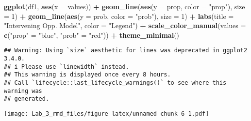 \documentclass[
]{article}
\newenvironment{Shaded}{\begin{snugshade}}{\end{snugshade}}
\newcommand{\AttributeTok}[1]{\textcolor[rgb]{0.13,0.29,0.53}{#1}}
\newcommand{\DecValTok}[1]{\textcolor[rgb]{0.00,0.00,0.81}{#1}}
\newcommand{\FunctionTok}[1]{\textcolor[rgb]{0.13,0.29,0.53}{\textbf{#1}}}
\newcommand{\NormalTok}[1]{#1}
\newcommand{\OtherTok}[1]{\textcolor[rgb]{0.56,0.35,0.01}{#1}}
\newcommand{\SpecialCharTok}[1]{\textcolor[rgb]{0.81,0.36,0.00}{\textbf{#1}}}
\newcommand{\StringTok}[1]{\textcolor[rgb]{0.31,0.60,0.02}{#1}}
\begin{document}
\begin{Shaded}
\begin{Highlighting}[]
\FunctionTok{ggplot}\NormalTok{(df1, }\FunctionTok{aes}\NormalTok{(}\AttributeTok{x =}\NormalTok{ values)) }\SpecialCharTok{+}
  \FunctionTok{geom\_line}\NormalTok{(}\FunctionTok{aes}\NormalTok{(}\AttributeTok{y =}\NormalTok{ prop, }\AttributeTok{color =} \StringTok{"prop"}\NormalTok{), }\AttributeTok{size =} \DecValTok{1}\NormalTok{) }\SpecialCharTok{+}
  \FunctionTok{geom\_line}\NormalTok{(}\FunctionTok{aes}\NormalTok{(}\AttributeTok{y =}\NormalTok{ prob, }\AttributeTok{color =} \StringTok{"prob"}\NormalTok{), }\AttributeTok{size =} \DecValTok{1}\NormalTok{) }\SpecialCharTok{+}
  \FunctionTok{labs}\NormalTok{(}\AttributeTok{title =} \StringTok{"Intervening Opp. Model"}\NormalTok{,}
       \AttributeTok{color =} \StringTok{"Legend"}\NormalTok{) }\SpecialCharTok{+}
  \FunctionTok{scale\_color\_manual}\NormalTok{(}\AttributeTok{values =} \FunctionTok{c}\NormalTok{(}\StringTok{"prop"} \OtherTok{=} \StringTok{"blue"}\NormalTok{, }\StringTok{"prob"} \OtherTok{=} \StringTok{"red"}\NormalTok{)) }\SpecialCharTok{+}
  \FunctionTok{theme\_minimal}\NormalTok{()}
\end{Highlighting}
\end{Shaded}

\begin{verbatim}
## Warning: Using `size` aesthetic for lines was deprecated in ggplot2 3.4.0.
## i Please use `linewidth` instead.
## This warning is displayed once every 8 hours.
## Call `lifecycle::last_lifecycle_warnings()` to see where this warning was
## generated.
\end{verbatim}

\texttt{[image: Lab\_3\_rmd\_files/figure-latex/unnamed-chunk-6-1.pdf]}
\end{document}

